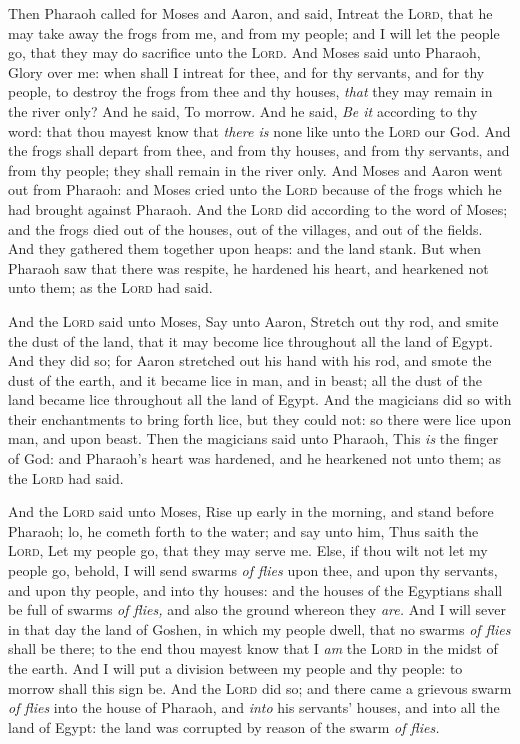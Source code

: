 \documentclass[11pt,letterpaper,oneside]{memoir}
\begin{document}
Then Pharaoh called for Moses and Aaron, and said, Intreat the
\textsc{Lord}, that he may take away the frogs from me, and from my
people; and I will let the people go, that they may do sacrifice unto
the \textsc{Lord}. And Moses said unto Pharaoh, Glory over me: when
shall I intreat for thee, and for thy servants, and for thy people, to
destroy the frogs from thee and thy houses, \emph{that} they may remain
in the river only? And he said, To morrow. And he said, \emph{Be it}
according to thy word: that thou mayest know that \emph{there is} none
like unto the \textsc{Lord} our God. And the frogs shall depart from
thee, and from thy houses, and from thy servants, and from thy people;
they shall remain in the river only. And Moses and Aaron went out from
Pharaoh: and Moses cried unto the \textsc{Lord} because of the frogs
which he had brought against Pharaoh. And the \textsc{Lord} did
according to the word of Moses; and the frogs died out of the houses,
out of the villages, and out of the fields. And they gathered them
together upon heaps: and the land stank. But when Pharaoh saw that there
was respite, he hardened his heart, and hearkened not unto them; as the
\textsc{Lord} had said.

And the \textsc{Lord} said unto Moses, Say unto Aaron, Stretch out thy
rod, and smite the dust of the land, that it may become lice throughout
all the land of Egypt. And they did so; for Aaron stretched out his hand
with his rod, and smote the dust of the earth, and it became lice in
man, and in beast; all the dust of the land became lice throughout all
the land of Egypt. And the magicians did so with their enchantments to
bring forth lice, but they could not: so there were lice upon man, and
upon beast. Then the magicians said unto Pharaoh, This \emph{is} the
finger of God: and Pharaoh's heart was hardened, and he hearkened not
unto them; as the \textsc{Lord} had said.

And the \textsc{Lord} said unto Moses, Rise up early in the morning, and
stand before Pharaoh; lo, he cometh forth to the water; and say unto
him, Thus saith the \textsc{Lord}, Let my people go, that they may serve
me. Else, if thou wilt not let my people go, behold, I will send swarms
\emph{of flies} upon thee, and upon thy servants, and upon thy people,
and into thy houses: and the houses of the Egyptians shall be full of
swarms \emph{of flies,} and also the ground whereon they \emph{are. }And I
will sever in that day the land of Goshen, in which my people dwell,
that no swarms \emph{of flies} shall be there; to the end thou mayest
know that I \emph{am} the \textsc{Lord} in the midst of the earth. And
I will put a division between my people and thy people: to morrow shall
this sign be. And the \textsc{Lord} did so; and there came a grievous
swarm \emph{of flies} into the house of Pharaoh, and \emph{into} his
servants' houses, and into all the land of Egypt: the land was corrupted
by reason of the swarm \emph{of flies.}
\end{document}
